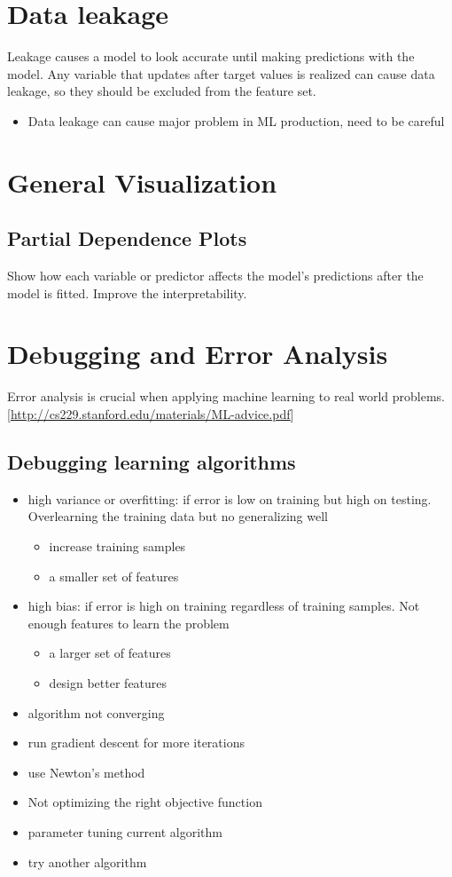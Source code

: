 \documentclass[11pt]{article}
\begin{document}
\section{Data leakage}
\label{sec:org93f9a6d}
Leakage causes a model to look accurate until making predictions with the model. Any variable that updates after target values is realized can cause data leakage, so they should be excluded from the feature set. 
\begin{itemize}
\item Data leakage can cause major problem in ML production, need to be careful
\end{itemize}

\section{General Visualization}
\label{sec:orgbc77d49}
\subsection{Partial Dependence Plots}
\label{sec:org0c5a188}
Show how each variable or predictor affects the model's predictions after the model is fitted. Improve the interpretability.   
\section{Debugging and Error Analysis}
\label{sec:orgd592c9d}
Error analysis is crucial when applying machine learning to real world problems.
[\url{http://cs229.stanford.edu/materials/ML-advice.pdf}]
\subsection{Debugging learning algorithms}
\label{sec:orgfc808d8}
\begin{itemize}
\item high variance or overfitting: if error is low on training but high on testing. Overlearning the training data but no generalizing well
\begin{itemize}
\item increase training samples
\item a smaller set of features
\end{itemize}
\item high bias: if error is high on training regardless of training samples. Not enough features to learn the problem
\begin{itemize}
\item a larger set of features
\item design better features
\end{itemize}
\item algorithm not converging
\item run gradient descent for more iterations
\item use Newton's method
\item Not optimizing the right objective function
\item parameter tuning current algorithm
\item try another algorithm
\end{itemize}
\end{document}
